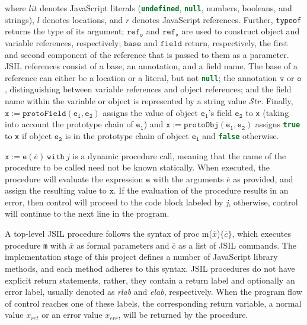 \documentclass[a4paper,11pt,twoside]{report}
\def\jsinline{\lstinline[language=JavaScript, basicstyle=\small]}%\end{lstlisting}
\begin{document}
\noindent where $lit$ denotes JavaScript literals (\jsinline|undefined|, \jsinline|null|, numbers, booleans, and strings), $l$ denotes locations, and $r$ denotes JavaScript references. Further, \texttt{typeof} returns the type of its argument; $\mathtt{ref_o}$ and $\mathtt{ref_v}$ are used to construct object and variable references, respectively; $\mathtt{base}$ and $\mathtt{field}$ return, respectively, the first and second component of the reference that is passed to them as a parameter. JSIL references consist of a base, an annotation, and a field name. The base of a reference can either be a location or a literal, but not \jsinline|null|; the annotation $\mathtt{v}$ or $\mathtt{o}$, distinguishing between variable references and object references; and the field name within the variable or object is represented by a string value $\mathcal{S}tr$. Finally, $\mathtt{x := protoField(e_1, e_2)}$ assigns the value of object $\mathtt{e_1}$'s field $\mathtt{e_2}$ to \texttt{x} (taking into account the prototype chain of $\mathtt{e_1}$) and $\mathtt{x := protoObj(e_1, e_2)}$ assigns \jsinline|true| to \texttt{x} if object $\mathtt{e_2}$ is in the prototype chain of object $\mathtt{e_1}$ and \jsinline|false| otherwise.

$\mathtt{x} := \mathtt{e}(\overline{e})\ \mathtt{with}\ \textit{j}$ is a dynamic procedure call, meaning that the name of the procedure to be called need not be known statically. When executed, the procedure will evaluate the expression $\mathtt{e}$ with the arguments $\overline{e}$ as provided, and assign the resulting value to $\mathtt{x}$. If the evaluation of the procedure results in an error, then control will proceed to the code block labeled by \textit{j}, otherwise, control will continue to the next line in the program. 

A top-level JSIL procedure follows the syntax of proc m($\overline{x}$)$\{\overline{c}\}$, which executes procedure \texttt{m} with $\overline{x}$ as formal parameters and $\overline{c}$ as a list of JSIL commands. The implementation stage of this project defines a number of JavaScript library methods, and each method adheres to this syntax. JSIL procedures do not have explicit return statements, rather, they contain a return label and optionally an error label, usually denoted as \textit{rlab} and \textit{elab}, respectively. When the program flow of control reaches one of these labels, the corresponding return variable, a normal value $x_{ret}$ or an error value $x_{err}$, will be returned by the procedure.
\end{document}
